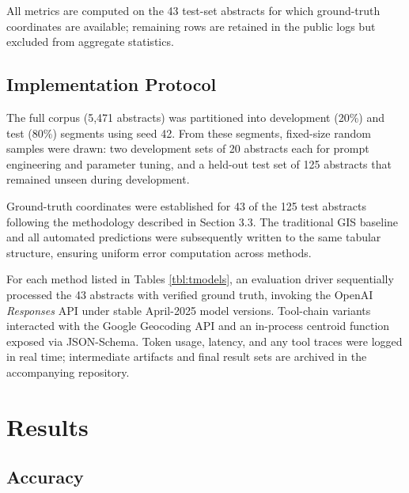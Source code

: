 \DIFdelend All metrics are computed on the 43 test-set abstracts for which
ground-truth coordinates are available; remaining rows are retained in
the public logs but excluded from aggregate statistics.

\subsection{Implementation Protocol}\label{implementation-protocol}

The full corpus (5,471 abstracts) was partitioned into development
(20\%) and test (80\%) segments using seed 42. From these segments,
fixed-size random samples were drawn: two development sets of 20
abstracts each for prompt engineering and parameter tuning, and a
held-out test set of 125 abstracts that remained unseen during
development.

Ground-truth coordinates were established for 43 of the 125 test
abstracts following the methodology described in Section 3.3. The
traditional GIS baseline and all automated predictions were subsequently
written to the same tabular structure, ensuring uniform error
computation across methods.

For each method listed in Tables \DIFdelbegin {}\DIFdelend \DIFaddbegin {}\DIFaddend \ref{tbl:tmodels}, an evaluation driver sequentially processed the 43
abstracts with verified ground truth, invoking the OpenAI
\emph{Responses} API under stable April-2025 model versions. Tool-chain
variants interacted with the Google Geocoding API and an in-process
centroid function exposed via JSON-Schema. Token usage, latency, and any
tool traces were logged in real time; intermediate artifacts and final
result sets are archived in the accompanying repository.

\DIFaddbegin {}

\DIFaddend \section{Results}\label{results}

\subsection{Accuracy}\label{accuracy}

